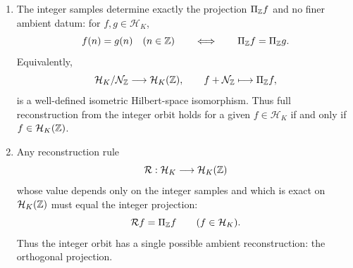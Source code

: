 \begin{lemma}
\begin{enumerate}[label=(\roman*)]
      \[
      \sum_{m\in\ZZ}\widehat f(\theta+2\pi m)
      \]
      converges absolutely and
      \begin{equation}\label{eq:lattice-alias-projection}
      q_{\Pi_{\ZZ}f}(\theta)
      =\frac{\displaystyle\sum_{m\in\ZZ}
      \widehat f(\theta+2\pi m)}
      {\Sigma_1(\theta)},
      \end{equation}
      equivalently
      \begin{equation}\label{eq:integer-orbit-projection-symbol}
      q_{\Pi_{\ZZ}f}(\theta)
      =
      \frac{\displaystyle\sum_{m\in\ZZ}\widehat f(\theta+2\pi m)}
      {\displaystyle\sum_{m\in\ZZ}e^{-2|\theta+2\pi m|}},
      \qquad -\pi\le\theta\le\pi,
      \end{equation}
      with $q_{\Pi_{\ZZ}f}$ extended $2\pi$-periodically to~$\RR$.
      Equivalently,
      \[
      \widehat{\Pi_{\ZZ}f}(\xi)=e^{-2\abs{\xi}}q_{\Pi_{\ZZ}f}(\xi)
      \qquad\text{for a.e. }\xi\in\RR.
      \]
      Moreover,
      \begin{equation}\label{eq:lattice-projection-norm}
      \|\Pi_{\ZZ}f\|_{\mathcal H_K}^2
      =\frac{1}{2\pi^2}\int_I
      \frac{\left|\sum_{m\in\ZZ}
      \widehat f(\theta+2\pi m)\right|^2}
      {\Sigma_1(\theta)}\,\dd\theta,
      \end{equation}
      and $\Pi_{\ZZ}f$ is the unique element of~$\mathcal H_K(\ZZ)$
      satisfying
      \[
      (\Pi_{\ZZ}f)(n)=f(n)
      \qquad(n\in\ZZ).
      \]
\item
      The integer samples determine exactly the projection $\Pi_{\ZZ}f$ and
      no finer ambient datum: for $f,g\in\mathcal H_K$,
      \begin{equation}\label{eq:uniform-lattice-quotient-rigidity}
      f(n)=g(n)\quad(n\in\mathbb{Z})
      \qquad\Longleftrightarrow\qquad
      \Pi_{\mathbb{Z}}f=\Pi_{\mathbb{Z}}g .
      \end{equation}
      Equivalently,
      \[
      \mathcal H_K/\mathcal N_{\mathbb{Z}}\longrightarrow\mathcal H_K(\mathbb{Z}),
      \qquad
      f+\mathcal N_{\mathbb{Z}}\longmapsto\Pi_{\mathbb{Z}}f,
      \]
      is a well-defined isometric Hilbert-space isomorphism.  Thus full
      reconstruction from the integer orbit holds for a given
      $f\in\mathcal H_K$ if and only if $f\in\mathcal H_K(\mathbb{Z})$.
\item
      Any reconstruction rule
      \[
      \mathcal R:\mathcal H_K\longrightarrow \mathcal H_K(\mathbb{Z})
      \]
      whose value depends only on the integer samples and which is exact on
      $\mathcal H_K(\ZZ)$ must equal the integer projection:
      \[
      \mathcal Rf=\Pi_{\mathbb{Z}}f\qquad(f\in\mathcal H_K).
      \]
      Thus the integer orbit has a single possible ambient reconstruction:
      the orthogonal projection.
\end{enumerate}
\end{lemma}

